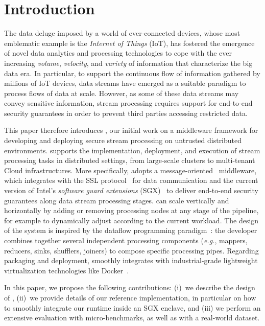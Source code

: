\section{Introduction}\label{sec:introduction}

The data deluge imposed by a world of ever-connected devices, whose most emblematic example is the \emph{Internet of Things} (IoT), has fostered the emergence of novel data analytics and processing technologies to cope with the ever increasing \emph{volume}, \emph{velocity}, and \emph{variety} of information that characterize the big data era.
In particular, to support the continuous flow of information gathered by millions of IoT devices, data streams have emerged as a suitable paradigm to process flows of data at scale.
However, as some of these data streams may convey sensitive information, stream processing requires support for end-to-end security guarantees in order to prevent third parties accessing restricted data.

This paper therefore introduces \SYS{}, our initial work on a middleware framework for developing and deploying secure stream processing on untrusted distributed environments.
\SYS{} supports the implementation, deployment, and execution of stream processing tasks in distributed settings, from large-scale clusters to multi-tenant Cloud infrastructures.
More specifically, \SYS{} adopts a message-oriented~\cite{mom} middleware, which integrates with the SSL protocol~\cite{freier2011secure} for data communication and the current version of Intel{\textregistered}'s \emph{software guard extensions} (SGX)~\cite{costan_intel} to deliver end-to-end security guarantees along data stream processing stages.
\SYS{} can scale vertically and horizontally by adding or removing processing nodes at any stage of the pipeline, for example to dynamically adjust according to the current workload.
The design of the \SYS{} system is inspired by the dataflow programming paradigm~\cite{uustalu_essence_2005}: the developer combines together several independent processing components (\emph{e.g.}, mappers, reducers, sinks, shufflers, joiners) to compose specific processing pipes.
Regarding packaging and deployment, \SYS{} smoothly integrates with industrial-grade lightweight virtualization technologies like Docker~\cite{docker}.

In this paper, we propose the following contributions: (i)~we describe the design of \SYS, (ii)~we provide details of our reference implementation, in particular on how to smoothly integrate our runtime inside an SGX enclave, and (iii) we perform an extensive evaluation with micro-benchmarks, as well as with a real-world dataset.

